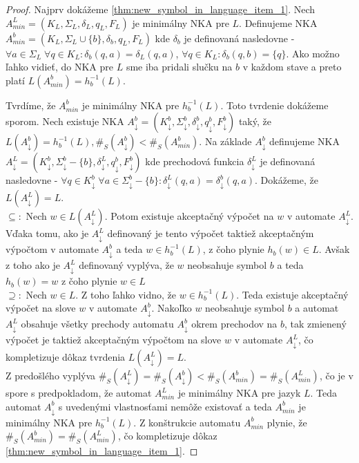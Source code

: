 \begin{proof}
Najprv dokážeme \ref{thm:new_symbol_in_language_item_1}. Nech $ A_{min}^{L} = (K_L, \Sigma_L, \delta_L, q_L, F_L) $ je minimálny NKA pre $ L $. Definujeme NKA $ A_{min}^{b} = (K_L, \Sigma_L \cup \lbrace b \rbrace, \delta_{b}, q_L, F_L) $ kde $ \delta_b $ je definovaná nasledovne - $ \forall a \in \Sigma_L \; \forall q \in K_L:  \delta_b(q,a) = \delta_L(q,a)$, $ \forall q \in K_L: \delta_b(q,b)= \lbrace q \rbrace $. Ako možno ľahko vidieť, do NKA pre $ L $ sme iba pridali slučku na $ b $ v každom stave a preto platí $ L(A_{min}^{b}) = h_{b}^{-1}(L) $. 
\par
Tvrdíme, že  $ A_{min}^{b} $ je minimálny NKA pre $ h_{b}^{-1}(L) $. Toto tvrdenie dokážeme sporom. Nech existuje NKA $ A_{\downarrow}^{b}=(K_{\downarrow}^{b}, \Sigma_{\downarrow}^{b}, \delta_{\downarrow}^{b}, q_{\downarrow}^{b}, F_{\downarrow}^{b}) $ taký, že $ L(A_{\downarrow}^{b}) = h_{b}^{-1}(L), \#_S(A_{\downarrow}^{b}) < \#_S(A_{min}^{b}) $. Na základe $ A_{\downarrow}^{b} $ definujeme NKA $ A_{\downarrow}^{L}=(K_{\downarrow}^{b}, \Sigma_{\downarrow}^{b} - \lbrace b \rbrace, \delta_{\downarrow}^{L}, q_{\downarrow}^{b}, F_{\downarrow}^{b}) $ kde prechodová funkcia $ \delta_{\downarrow}^{L} $ je definovaná nasledovne - $ \forall q \in K_{\downarrow}^{b} \; \forall a \in \Sigma_{\downarrow}^{b} - \lbrace b \rbrace : \delta_{\downarrow}^{L}(q,a) = \delta_{\downarrow}^{b}(q,a) $. Dokážeme, že $ L(A_{\downarrow}^{L})=L $. \\
$ \subseteq: $ Nech $ w \in L(A_{\downarrow}^{L}) $. Potom existuje akceptačný výpočet na $ w $ v automate $ A_{\downarrow}^{L} $. Vďaka tomu, ako je $ A_{\downarrow}^{L} $ definovaný je tento výpočet taktiež akceptačným výpočtom v automate $ A_{\downarrow}^{b} $ a teda $ w \in h_{b}^{-1}(L) $, z čoho plynie $ h_b(w) \in L $. Avšak z toho ako je $ A_{\downarrow}^{L} $ definovaný vyplýva, že $ w $ neobsahuje symbol $ b $ a teda $ h_b(w)=w $ z čoho plynie $ w \in L $ \\
$ \supseteq: $ Nech $ w \in L $. Z toho ľahko vidno, že $ w \in h_{b}^{-1}(L) $. Teda existuje akceptačný výpočet na slove $ w $ v automate $ A_{\downarrow}^{b} $. Nakoľko $ w $ neobsahuje symbol $ b $ a automat $ A_{\downarrow}^{L} $ obsahuje všetky prechody automatu $ A_{\downarrow}^{b} $ okrem prechodov na $ b $, tak zmienený výpočet je taktiež akceptačným výpočtom na slove $ w $ v automate $ A_{\downarrow}^{L} $, čo kompletizuje dôkaz tvrdenia $ L(A_{\downarrow}^{L})=L $. \\
Z predošlého vyplýva $ \#_S(A_{\downarrow}^{L})=\#_S(A_{\downarrow}^{b}) < \#_S(A_{min}^{b}) = \#_S(A_{min}^{L}) $, čo je v spore s predpokladom, že automat $ A_{min}^{L} $ je minimálny NKA pre jazyk $ L $. Teda automat $ A_{\downarrow}^{b} $ s uvedenými vlastnosťami nemôže existovať a teda $ A_{min}^{b} $ je minimálny NKA pre $ h_{b}^{-1}(L) $. Z konštrukcie automatu $ A_{min}^{b} $ plynie, že $ \#_S(A_{min}^{b}) = \#_S(A_{min}^{L}) $, čo kompletizuje dôkaz \ref{thm:new_symbol_in_language_item_1}.

\end{proof}
